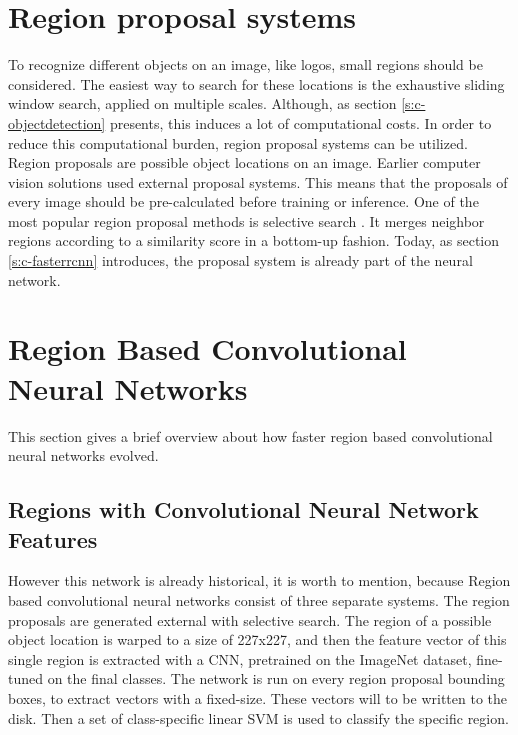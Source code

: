 \section{Region proposal systems}\label{s:c-rpn}
To recognize different objects on an image, like logos, small regions should be considered. The easiest way to search for these locations is the exhaustive sliding window search, applied on multiple scales. Although, as section \ref{s:c-objectdetection} presents, this induces a lot of computational costs. In order to reduce this computational burden, region proposal systems can be utilized. Region proposals are possible object locations on an image.
\smallbreak
Earlier computer vision solutions used external proposal systems. This means that the proposals of every image should be pre-calculated before training or inference. One of the most popular region proposal methods is selective search \cite{Uijlings13}. It merges neighbor regions according to a similarity score in a bottom-up fashion. Today, as section \ref{s:c-fasterrcnn} introduces, the proposal system is already part of the neural network.

\section{Region Based Convolutional Neural Networks}\label{s:c-rcnn}

This section gives a brief overview about how faster region based convolutional neural networks evolved.

\subsection{Regions with Convolutional Neural Network Features}
However this network is already historical, it is worth to mention, because Region based convolutional neural networks \cite{DBLP:journals/corr/GirshickDDM13} consist of three separate systems. The region proposals are generated external with selective search. The region of a possible object location is warped to a size of 227x227, and then the feature vector of this single region is extracted with a CNN, pretrained on the ImageNet dataset, fine-tuned on the final classes. The network is run on every region proposal bounding boxes, to extract vectors with a fixed-size. These vectors will to be written to the disk. Then a set of class-specific linear SVM is used to classify the specific region.

